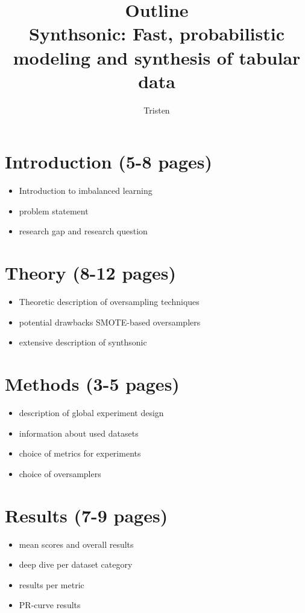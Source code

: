 \documentclass{article}
\author{Tristen}
\title{Outline \\ Synthsonic: Fast, probabilistic modeling and synthesis of tabular data}
\begin{document}
\maketitle

\section{Introduction (5-8 pages)}
    \begin{itemize}
        \item Introduction to imbalanced learning
        \item problem statement
        \item research gap and research question
    \end{itemize}

\section{Theory (8-12 pages)}
    \begin{itemize}
        \item Theoretic description of oversampling techniques
        \item potential drawbacks SMOTE-based oversamplers
        \item extensive description of synthsonic
    \end{itemize}

\section{Methods (3-5 pages)}
    \begin{itemize}
        \item description of global experiment design
        \item information about used datasets
        \item choice of metrics for experiments
        \item choice of oversamplers
    \end{itemize}
    
\section{Results (7-9 pages)}
        \begin{itemize}
        \item mean scores and overall results
        \item deep dive per dataset category
        \item results per metric
        \item PR-curve results
    \end{itemize}
    
\end{document}
